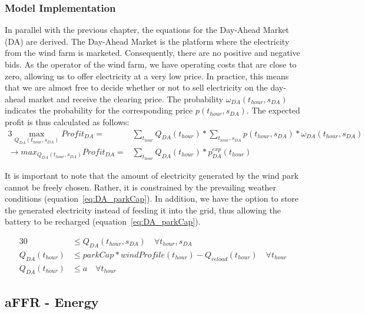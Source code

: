 \subsubsection{Model Implementation}
In parallel with the previous chapter, the equations for the Day-Ahead Market (DA) are derived.
The Day-Ahead Market is the platform where the electricity from the wind farm is marketed. Consequently, there are no positive and negative bids.
As the operator of the wind farm, we have operating costs that are close to zero, allowing us to offer electricity at a very low price.
In practice, this means that we are almost free to decide whether or not to sell electricity on the day-ahead market and receive the clearing price.
The probability $\omega_{DA}(t_{hour}, s_{DA})$ indicates the probability for the corresponding price $p(t_{hour}, s_{DA})$.
The expected profit is thus calculated as follows:\\

\begin{alignat}{3}
	\max_{Q_{DA}(t_{hour}, s_{DA})} Profit_{DA}	=            & \sum_{t_{hour}} Q_{DA}(t_{hour}) * \sum_{t_{hour}, s_{DA}}  p(t_{hour}, s_{DA}) * \omega_{DA}(t_{hour}, s_{DA}) \\
	\rightarrow max_{Q_{DA}(t_{hour}, s_{DA})} Profit_{DA}	= & \sum_{t_{hour}} Q_{DA}(t_{hour}) * p^{exp}_{DA}(t_{hour})
\end{alignat}

It is important to note that the amount of electricity generated by the wind park cannot be freely chosen.
Rather, it is constrained by the prevailing weather conditions (equation~\ref{eq:DA_parkCap}).
In addition, we have the option to store the generated electricity instead of feeding it into the grid,
thus allowing the battery to be recharged (equation~\ref{eq:DA_parkCap}).


\begin{alignat}{3}
	0                & \leq Q_{DA}(t_{hour}, s_{DA}) \quad\forall  t_{hour}, s_{DA}      \label{eq:DA_nonNeg}                  \\
	Q_{DA}(t_{hour}) & \leq parkCap * windProfile(t_{hour}) - Q_{reload}(t_{hour}) \quad\forall t_{hour} \label{eq:DA_parkCap} \\
	Q_{DA}(t_{hour}) & \leq a \quad\forall t_{hour} \label{eq:DA_a}
\end{alignat}

\subsection{aFFR - Energy}
\label{subsec:RA}
